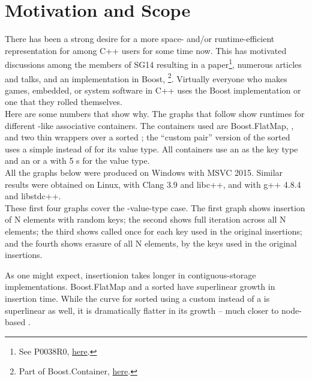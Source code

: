 \section{Motivation and Scope}

There has been a strong desire for a more space- and/or runtime-efficient
representation for  among C++ users for some time now.  This has
motivated discussions among the members of SG14 resulting in a
paper\footnote{See P0038R0,
  \href{http://www.open-std.org/jtc1/sc22/wg21/docs/papers/2015/p0038r0.html}{here}.},
numerous articles and talks, and an implementation in Boost,
\footnote{Part of Boost.Container,
  \href{http://www.boost.org/doc/libs/1_61_0/doc/html/container.html}{here}.}.
Virtually everyone who makes games, embedded, or system software in C++ uses
the Boost implementation or one that they rolled themselves.\\

Here are some numbers that show why.  The graphs that follow show runtimes for
different -like associative containers.  The containers used are
Boost.FlatMap, , and two thin wrappers over a sorted ;
the ``custom pair'' version of the sorted  uses a simple
 instead of  for its value type.  All containers use
an  as the key type and an  or a  with 5
s for the value type.\\

All the graphs below were produced on Windows with MSVC 2015.  Similar results
were obtained on Linux, with Clang 3.9 and libc++, and with g++ 4.8.4 and
libstdc++.\\

These first four graphs cover the -value-type case.  The first graph
shows insertion of N elements with random keys; the second shows full
iteration across all N elements; the third shows  called once
for each key used in the original insertions; and the fourth shows erasure of
all N elements, by the keys used in the original insertions.


As one might expect, insertionion takes longer in contiguous-storage
implementations.  Boost.FlatMap and a sorted 
have superlinear growth in insertion time.  While the curve for sorted
 using a custom  instead of a  is
superlinear as well, it is dramatically flatter in its growth -- much closer
to node-based .

